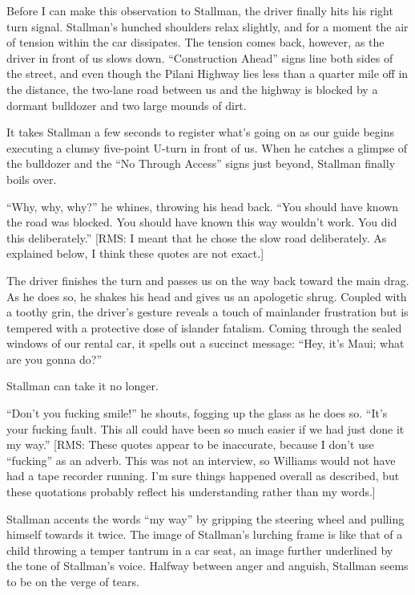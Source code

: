 Before I can make this observation to Stallman, the driver finally hits his right turn signal. Stallman's hunched shoulders relax slightly, and for a moment the air of tension within the car dissipates. The tension comes back, however, as the driver in front of us slows down. ``Construction Ahead'' signs line both sides of the street, and even though the Pilani Highway lies less than a quarter mile off in the distance, the two-lane road between us and the highway is blocked by a dormant bulldozer and two large mounds of dirt.

It takes Stallman a few seconds to register what's going on as our guide begins executing a clumsy five-point U-turn in front of us. When he catches a glimpse of the bulldozer and the ``No Through Access'' signs just beyond, Stallman finally boils over.

``Why, why, why?'' he whines, throwing his head back. ``You should have known the road was blocked. You should have known this way wouldn't work. You did this deliberately.''  [RMS: I meant that he chose the slow road deliberately.  As explained below, I think these quotes are not exact.]

The driver finishes the turn and passes us on the way back toward the main drag. As he does so, he shakes his head and gives us an apologetic shrug. Coupled with a toothy grin, the driver's gesture reveals a touch of mainlander frustration but is tempered with a protective dose of islander fatalism. Coming through the sealed windows of our rental car, it spells out a succinct message: ``Hey, it's Maui; what are you gonna do?''

Stallman can take it no longer.

``Don't you fucking smile!'' he shouts, fogging up the glass as he does so. ``It's your fucking fault. This all could have been so much easier if we had just done it my way.'' [RMS: These quotes appear to be inaccurate, because I don't use ``fucking'' as an adverb.  This was not an interview, so Williams would not have had a tape recorder running.  I'm sure things happened overall as described, but these quotations probably reflect his understanding rather than my words.]

Stallman accents the words ``my way'' by gripping the steering wheel and pulling himself towards it twice. The image of Stallman's lurching frame is like that of a child throwing a temper tantrum in a car seat, an image further underlined by the tone of Stallman's voice. Halfway between anger and anguish, Stallman seems to be on the verge of tears.

